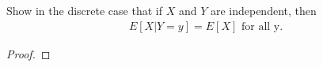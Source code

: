 \begin{problem}{3.9}
  Show in the discrete case that if $X$ and $Y$ are independent, then
  \begin{align*}
    E[X|Y=y] = E[X] \text{ for all y.}
  \end{align*}
\end{problem}

\begin{proof}
\end{proof}
\newpage
